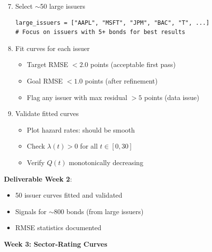 \documentclass[11pt,a4paper]{article}
\begin{document}
\begin{enumerate}
    \setcounter{enumi}{6}
    \item Select $\sim$50 large issuers
    \begin{lstlisting}
large_issuers = ["AAPL", "MSFT", "JPM", "BAC", "T", ...]
# Focus on issuers with 5+ bonds for best results
    \end{lstlisting}
    
    \item Fit curves for each issuer
    \begin{itemize}
        \item Target RMSE $< 2.0$ points (acceptable first pass)
        \item Goal RMSE $< 1.0$ points (after refinement)
        \item Flag any issuer with max residual $> 5$ points (data issue)
    \end{itemize}
    
    \item Validate fitted curves
    \begin{itemize}
        \item Plot hazard rates: should be smooth
        \item Check $\lambda(t) > 0$ for all $t \in [0, 30]$
        \item Verify $Q(t)$ monotonically decreasing
    \end{itemize}
\end{enumerate}

\textbf{Deliverable Week 2}: 
\begin{itemize}
    \item 50 issuer curves fitted and validated
    \item Signals for $\sim$800 bonds (from large issuers)
    \item RMSE statistics documented
\end{itemize}

\vspace{0.5cm}

\textbf{Week 3: Sector-Rating Curves}
\end{document}
